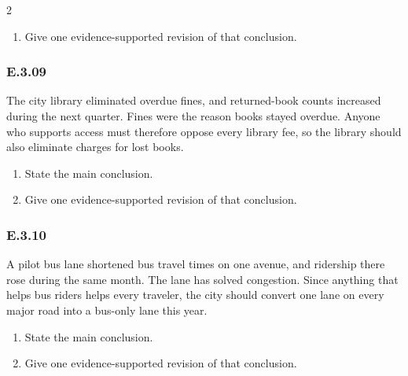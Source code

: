 \documentclass[10pt]{extarticle}
\newcommand{\bankitem}[1]{\subsubsection*{#1}}
\begin{document}
\begin{multicols}{2}
\begin{enumerate}[label=(\alph*)]
  \item Give one evidence-supported revision of that conclusion.
\end{enumerate}
\bankitem{E.3.09}
The city library eliminated overdue fines, and returned-book counts increased during the next quarter. Fines were the reason books stayed overdue. Anyone who supports access must therefore oppose every library fee, so the library should also eliminate charges for lost books.
\begin{enumerate}[label=(\alph*)]
  \item State the main conclusion.
  \item Give one evidence-supported revision of that conclusion.
\end{enumerate}
\bankitem{E.3.10}
A pilot bus lane shortened bus travel times on one avenue, and ridership there rose during the same month. The lane has solved congestion. Since anything that helps bus riders helps every traveler, the city should convert one lane on every major road into a bus-only lane this year.
\begin{enumerate}[label=(\alph*)]
  \item State the main conclusion.
  \item Give one evidence-supported revision of that conclusion.
\end{enumerate}
\end{multicols}
\end{document}
